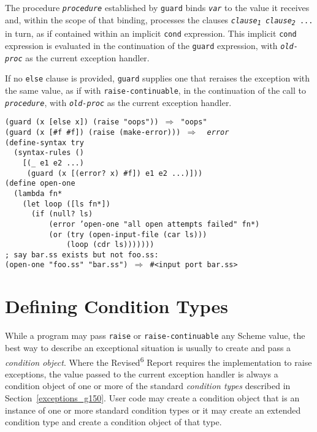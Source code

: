 The procedure \texttt{\textit{procedure}} established by \texttt{guard} binds \texttt{\textit{var}}
to the value it receives and, within the scope of that binding, processes
the clauses \texttt{\textit{clause\textsubscript{1}} \textit{clause\textsubscript{2}} ...} in turn, as
if contained within an implicit \texttt{cond} expression.
This implicit \texttt{cond} expression is evaluated in the continuation
of the \texttt{guard} expression, with \texttt{\textit{old-proc}} as the current
exception handler.


If no \texttt{else} clause is provided, \texttt{guard} supplies one
that reraises the exception with the same value, as if with
\texttt{raise-continuable}, in the continuation of the call to \texttt{\textit{procedure}},
with \texttt{\textit{old-proc}} as the current exception handler.


\begin{alltt}
(guard (x [else x]) (raise "oops")) \(\Rightarrow\) "oops"
(guard (x [\#{}f \#{}f]) (raise (make-error))) \(\Rightarrow\)  \textit{error}
(define-syntax try
  (syntax-rules ()
    [(\_{} e1 e2 ...)
     (guard (x [(error? x) \#{}f]) e1 e2 ...)]))
(define open-one
  (lambda fn*
    (let loop ([ls fn*])
      (if (null? ls)
          (error 'open-one "all open attempts failed" fn*)
          (or (try (open-input-file (car ls)))
              (loop (cdr ls)))))))
; say bar.ss exists but not foo.ss:
(open-one "foo.ss" "bar.ss") \(\Rightarrow\) \#{}\textless{}input port bar.ss\textgreater{}
\end{alltt}

\section{\label{exceptions_g149}\label{exceptions_h2}Defining Condition Types}



\label{exceptions_s9}\label{exceptions_s10}While a program may pass \texttt{raise} or \texttt{raise-continuable}
any Scheme value, the best way to describe an exceptional situation is
usually to create and pass a \textit{condition object}.
Where the Revised\textsuperscript{6} Report requires the implementation to raise
exceptions, the value passed to the current exception handler is always
a condition object of one or more of the standard \textit{condition types}
described in Section \ref{exceptions_g150}.
User code may create a condition object that is an instance of one or more
standard condition types or it may create an extended
condition type and create a condition object of that type.


